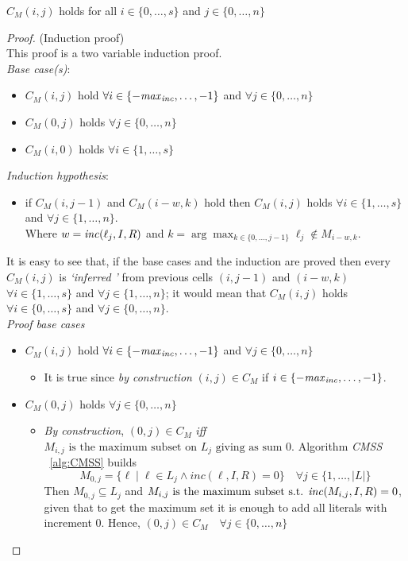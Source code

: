 \begin{theorem}
    \label{thereom:inductive:cmin}
    $C_M(i,j)$ holds for all $i \in \{0, \hdots, s\}$
    and $j \in \{0, \hdots, n\}$
\end{theorem}

\begin{proof}(Induction proof)\\
   This proof is a two variable induction proof.\\
   \textit{Base case(s)}:
   \begin{itemize}
        \item $C_M(i,j)$ hold $\forall i \in \{-\mathit{max}_{\mathit{inc}}, \hdots, -1\}$ and $\forall j \in \{0, \hdots, n\}$ 
        \item $C_M(0,j)$ holds $\forall j \in \{0, \hdots, n\}$ 
        \item $C_M(i,0)$ holds $\forall i \in \{1, \hdots, s\}$
   \end{itemize}
   \textit{Induction hypothesis}:
   \begin{itemize}
        \item if $C_M(i,j-1)$ and $C_M(i-w,k)$ hold then $C_M(i,j)$ holds $\forall i \in \{1,\hdots,s\}$
        and $\forall j \in \{1, \hdots, n\}$.
        \\ Where $w = \mathit{inc}(\ell_j,I,R)$ and $k = \arg \max_{k \in \{0,\hdots,j-1\}} \ell_j \not\in M_{i-w,k}$.
   \end{itemize}
   It is easy to see that, if the base cases  and the induction are proved then 
   every $C_M(i,j)$ is \textit{`inferred '} from previous cells $(i,j-1)$ and $(i-w,k)$ 
   $\forall i \in \{1,\hdots,s\}$ and $\forall j \in \{1, \hdots, n\}$;
   it would mean that $C_M(i,j)$ holds $\forall i \in \{0,\hdots,s\}$ and $\forall j \in \{0, \hdots, n\}$.\\
   \textit{Proof base cases}
   \begin{itemize}
    \item $C_M(i,j)$ hold $\forall i \in \{-\mathit{max}_{\mathit{inc}}, \hdots, -1\}$ and $\forall j \in \{0, \hdots, n\}$ 
    \begin{itemize}
        \item It is true since \textit{by construction} $(i,j) \in C_M$ if $i \in \{-\mathit{max}_{\mathit{inc}}, \hdots, -1\}$.
    \end{itemize}
    \item $C_M(0,j)$ holds $\forall j \in \{0, \hdots, n\}$ 
    \begin{itemize}
        \item \textit{By construction}, $(0,j) \in C_M$ \textit{iff}
        $M_{i,j} \text{ is the maximum subset on } L_j \text{ giving as sum } 0$.
        Algorithm \textit{CMSS} ~\eqref{alg:CMSS} builds 
        $$M_{0,j} = \{ \ell \mid \ell \in L_j \land inc(\ell,I,R) = 0\} \quad \forall j \in \{1, \hdots , |L|\}$$
        Then $M_{0,j} \subseteq L_j$ and
        $M_{i,j} \text{ is the maximum subset s.t. } \mathit{inc}(M_{i,j},I,R) = 0$,
        given that to get the maximum set it is enough to add all literals with increment 0.
        Hence, $(0,j) \in C_M \quad \forall j \in \{0, \hdots, n\}$ 


\end{itemize}
\end{itemize}
\end{proof}
